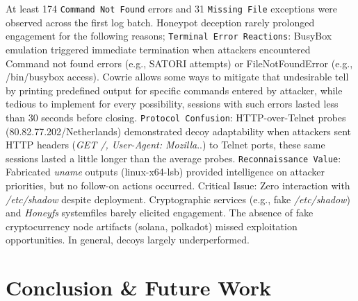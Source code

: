 \documentclass{cls/ULBreport}
\begin{document}
At least 174 \texttt{Command Not Found} errors and 31 \texttt{Missing File} exceptions were observed across the first log batch. Honeypot deception rarely prolonged engagement for the following reasons; \texttt{Terminal Error Reactions}: BusyBox emulation triggered immediate termination when attackers encountered Command not found errors (e.g., SATORI attempts) or FileNotFoundError (e.g., /bin/busybox access). Cowrie allows some ways to mitigate that undesirable tell by printing predefined output for specific commands entered by attacker, while tedious to implement for every possibility, sessions with such errors lasted less than 30 seconds before closing. \texttt{Protocol Confusion}: HTTP-over-Telnet probes (80.82.77.202/Netherlands) demonstrated decoy adaptability when attackers sent HTTP headers (\textit{GET /, User-Agent: Mozilla}..) to Telnet ports, these same sessions lasted a little longer than the average probes. \texttt{Reconnaissance Value}: Fabricated \textit{uname} outputs (linux-x64-lsb) provided intelligence on attacker priorities, but no follow-on actions occurred. Critical Issue: Zero interaction with \textit{/etc/shadow} despite deployment. Cryptographic services (e.g., fake \textit{/etc/shadow}) and \textit{Honeyfs} systemfiles barely elicited engagement. The absence of fake cryptocurrency node artifacts (solana, polkadot) missed exploitation opportunities. In general, decoys largely underperformed.








\section{Conclusion \& Future Work}
\end{document}
